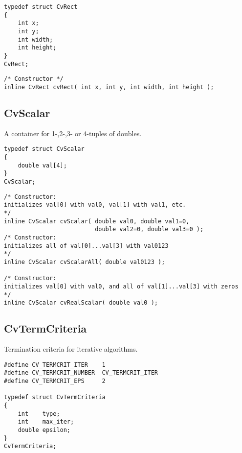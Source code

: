 \begin{lstlisting}
typedef struct CvRect
{
    int x; 
    int y; 
    int width; 
    int height; 
}
CvRect;
\end{lstlisting}

\begin{description}
\end{description}

\begin{lstlisting}
/* Constructor */
inline CvRect cvRect( int x, int y, int width, int height );
\end{lstlisting}

\subsection{CvScalar}\label{CvScalar}
A container for 1-,2-,3- or 4-tuples of doubles.

\begin{lstlisting}
typedef struct CvScalar
{
    double val[4];
}
CvScalar;
\end{lstlisting}

\begin{lstlisting}
/* Constructor: 
initializes val[0] with val0, val[1] with val1, etc. 
*/
inline CvScalar cvScalar( double val0, double val1=0,
                          double val2=0, double val3=0 );
/* Constructor: 
initializes all of val[0]...val[3] with val0123 
*/
inline CvScalar cvScalarAll( double val0123 );

/* Constructor: 
initializes val[0] with val0, and all of val[1]...val[3] with zeros 
*/
inline CvScalar cvRealScalar( double val0 );
\end{lstlisting}

\subsection{CvTermCriteria}\label{CvTermCriteria}
Termination criteria for iterative algorithms.

\begin{lstlisting}
#define CV_TERMCRIT_ITER    1
#define CV_TERMCRIT_NUMBER  CV_TERMCRIT_ITER
#define CV_TERMCRIT_EPS     2

typedef struct CvTermCriteria
{
    int    type;
    int    max_iter; 
    double epsilon; 
}
CvTermCriteria;
\end{lstlisting}

